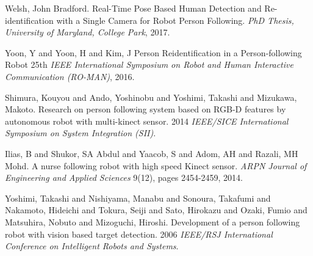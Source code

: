 \documentclass{svproc}
\begin{document}
\begin{thebibliography}{6}
Welsh, John Bradford.
Real-Time Pose Based Human Detection and Re-identification with a Single Camera for Robot Person Following.
\textit{PhD Thesis, University of Maryland, College Park}, 2017.

Yoon, Y and Yoon, H and Kim, J
Person Reidentification in a Person-following Robot
25th \textit{IEEE International Symposium on Robot and Human Interactive Communication (RO-MAN)}, 2016.

Shimura, Kouyou and Ando, Yoshinobu and Yoshimi, Takashi and Mizukawa, Makoto. 
Research on person following system based on RGB-D features by autonomous robot with multi-kinect sensor.
2014 \textit{IEEE/SICE International Symposium on System Integration (SII)}.

Ilias, B and Shukor, SA Abdul and Yaacob, S and Adom, AH and Razali, MH Mohd.
A nurse following robot with high speed Kinect sensor.
\textit{ARPN Journal of Engineering and Applied Sciences} 9(12), pages 2454-2459, 2014.

Yoshimi, Takashi and Nishiyama, Manabu and Sonoura, Takafumi and Nakamoto, Hideichi and Tokura, Seiji and Sato, Hirokazu and Ozaki, Fumio and Matsuhira, Nobuto and Mizoguchi, Hiroshi.
Development of a person following robot with vision based target detection.
2006 \textit{IEEE/RSJ International Conference on Intelligent Robots and Systems}.


\end{thebibliography}
\end{document}
